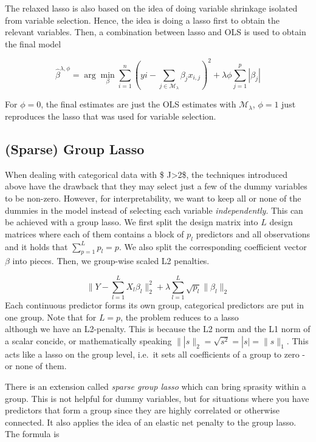 \documentclass[]{book}
\begin{document}
The relaxed lasso is also based on the idea of doing variable shrinkage
isolated from variable selection. Hence, the idea is doing a lasso first
to obtain the relevant variables. Then, a combination between lasso and
OLS is used to obtain the final model

\[\hat{\beta}^{\lambda, \phi} = \arg\min\limits_{\beta} \sum\limits_{i = 1}^n(yi - 
\sum\limits_{j \in \mathcal{M}_\lambda} \beta_j x_{i, j})^2 + 
\lambda \phi \sum\limits_{j = 1}^p|\beta_j|\]

For \(\phi = 0\), the final estimates are just the OLS estimates with
\(\mathcal{M}_\lambda\), \(\phi = 1\) just reproduces the lasso that was
used for variable selection.

\subsection{(Sparse) Group Lasso}\label{sparse-group-lasso}

When dealing with categorical data with \$ J\textgreater{}2\$, the
techniques introduced above have the drawback that they may select just
a few of the dummy variables to be non-zero. However, for
interpretability, we want to keep all or none of the dummies in the
model instead of selecting each variable \emph{independently}. This can
be achieved with a group lasso. We first split the design matrix into
\(L\) design matrices where each of them contains a block of \(p_l\)
predictors and all observations and it holds that
\(\sum\limits_{p = 1}^L p_l = p\). We also split the corresponding
coefficient vector \(\beta\) into pieces. Then, we group-wise scaled L2
penalties.

\[ \|Y-\sum\limits_{l = 1}^L X_l\beta_l \|_2^2 + 
\lambda \sum\limits_{l = 1}^L \sqrt{p_l} \|\beta_l\|_2\] Each continuous
predictor forms its own group, categorical predictors are put in one
group. Note that for \(L = p\), the problem reduces to a lasso\\
although we have an L2-penalty. This is because the L2 norm and the L1
norm of a scalar concide, or mathematically speaking
\(\||s\|_2 = \sqrt{s^2} = |s| = \|s\|_1\). This acts like a lasso on the
group level, i.e.~it sets all coefficients of a group to zero - or none
of them.

There is an extension called \emph{sparse group lasso} which can bring
sprasity within a group. This is not helpful for dummy variables, but
for situations where you have predictors that form a group since they
are highly correlated or otherwise connected. It also applies the idea
of an elastic net penalty to the group lasso. The formula is
\end{document}
